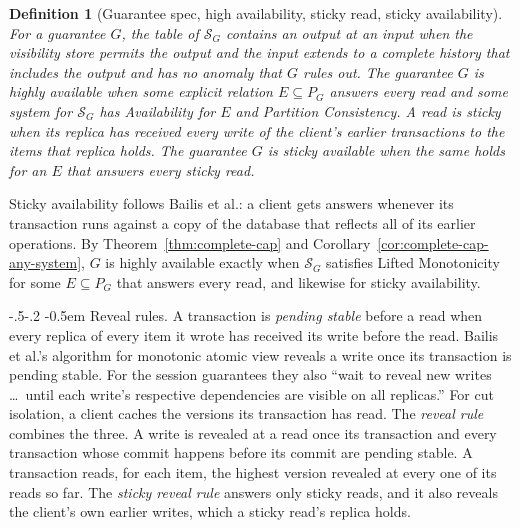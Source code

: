 \documentclass[sigconf]{cidr-2027}
\makeatletter
\newtheorem{definition}{Definition}
\theoremstyle{remark}
\renewcommand\paragraph{\@startsection{paragraph}{4}{\z@}%
  {-.5\baselineskip \@plus -2\p@ \@minus -.2\p@}%
  {-0.5em}%
  {\normalfont\bfseries}}
\newcommand{\Spec}{\mathcal{S}}
\makeatother
\begin{document}
\begin{definition}[Guarantee spec, high availability, sticky read, sticky availability]
\label{def:hat-availability}
For a guarantee $G$, the table of $\Spec_G$ contains an output at an input when
the visibility store permits the output and the input extends to a complete
history that includes the output and has no anomaly that $G$ rules out. The
guarantee $G$ is \emph{highly available} when some explicit relation
$E\subseteq P_G$ answers every read and some system for $\Spec_G$ has
Availability for $E$ and Partition Consistency. A read is \emph{sticky} when
its replica has received every write of the client's earlier transactions to
the items that replica holds. The guarantee $G$ is \emph{sticky available}
when the same holds for an $E$ that answers every sticky read.
\end{definition}

Sticky availability follows Bailis et al.: a client gets answers whenever its
transaction runs against a copy of the database that reflects all of its
earlier operations. By Theorem~\ref{thm:complete-cap} and
Corollary~\ref{cor:complete-cap-any-system}, $G$ is highly available exactly
when $\Spec_G$ satisfies Lifted Monotonicity for some $E\subseteq P_G$ that
answers every read, and likewise for sticky availability.

\paragraph{Reveal rules.}
A transaction is \emph{pending stable} before a read when every replica of
every item it wrote has received its write before the read. Bailis et al.'s
algorithm for monotonic atomic view reveals a write once its transaction is
pending stable. For the session guarantees they also ``wait to reveal new
writes \ldots\ until each write's respective dependencies are visible on all
replicas.''  For cut isolation, a client caches the versions its transaction
has read. The \emph{reveal rule} combines the three. A write is revealed at
a read once its transaction and every transaction whose commit happens before
its commit are pending stable. A transaction reads, for each item, the
highest version revealed at every one of its reads so far. The \emph{sticky
reveal rule} answers only sticky reads, and it also reveals the client's own
earlier writes, which a sticky read's replica holds.
\end{document}
